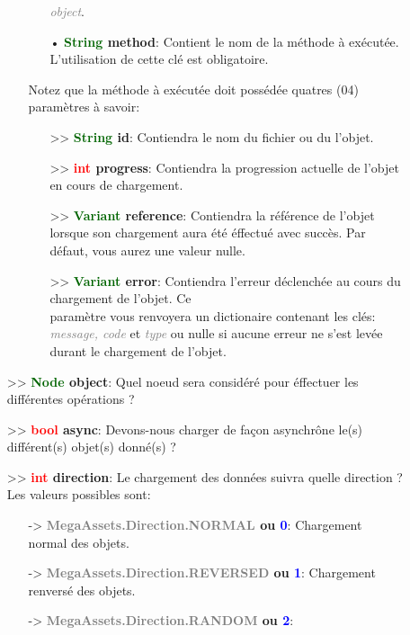 \documentclass[a4paper, 11pt]{article}
\begin{document}
\begin{description}
\begin{itemize}
\begin{itemize}
\begin{itemize}
			       \textit{\textcolor{gray}{object}}.
			       \item[• \textbf{\textcolor{darkgreen}{String} method}:] Contient le nom de la méthode à 
			       exécutée. L'utilisation de cette clé est obligatoire.
			   \end{itemize}
				Notez que la méthode à exécutée doit possédée quatres (04) paramètres à savoir:
				\begin{itemize}
					\item [>> \textbf{\textcolor{darkgreen}{String} id}:] Contiendra le nom du fichier ou du
					l'objet.
					\item [>> \textbf{\textcolor{red}{int} progress}:] Contiendra la progression actuelle de
					l'objet en cours de chargement.
					\item [>> \textbf{\textcolor{darkgreen}{Variant} reference}:] Contiendra la référence de
					l'objet lorsque son chargement aura été éffectué avec succès. Par défaut, vous aurez une
					valeur nulle.
					\item [>> \textbf{\textcolor{darkgreen}{Variant} error}:] Contiendra l'erreur déclenchée
					au cours du chargement de l'objet. Ce \\paramètre vous renvoyera un dictionaire
					contenant les clés: \textit{\textcolor{gray}{message, code}} et \textit{\textcolor{gray}
					{type}} ou nulle si aucune erreur ne s'est levée durant le chargement de l'objet.
				\end{itemize}
			\end{itemize}
			\item [>> \textbf{\textcolor{darkgreen}{Node} object}:] Quel noeud sera considéré pour éffectuer
			les différentes opérations ?
			\item [>> \textbf{\textcolor{red}{bool} async}:] Devons-nous charger de façon asynchrône le(s)
			différent(s) objet(s) donné(s) ?
			\item [>> \textbf{\textcolor{red}{int} direction}:] Le chargement des données suivra quelle 
			direction ? Les valeurs possibles sont:
			\begin{itemize}
				\item [-> \textbf{\textcolor{gray}{MegaAssets.Direction.NORMAL} ou \textcolor{blue}{0}}:] 
				Chargement normal des objets.
				\item [-> \textbf{\textcolor{gray}{MegaAssets.Direction.REVERSED} ou \textcolor{blue}{1}}:] 
				Chargement renversé des objets.
				\item [-> \textbf{\textcolor{gray}{MegaAssets.Direction.RANDOM} ou \textcolor{blue}{2}}:] 

\end{itemize}
\end{itemize}
\end{description}
\end{document}
